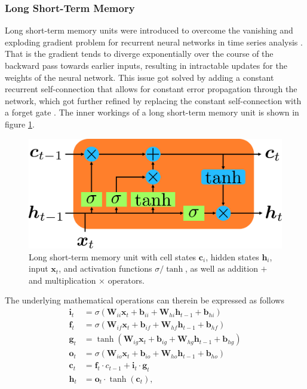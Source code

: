 \subsubsection{Long Short-Term Memory}
Long short-term memory units were introduced to overcome the vanishing and exploding gradient problem for recurrent neural networks in time series analysis \cite{hochreiter1997long}. That is the gradient tends to diverge exponentially over the course of the backward pass towards earlier inputs, resulting in intractable updates for the weights of the neural network. This issue got solved by adding a constant recurrent self-connection that allows for constant error propagation through the network, which got further refined by replacing the constant self-connection with a forget gate \cite{gers1999learning}. The inner workings of a long short-term memory unit is shown in figure \ref{fig::321_lstm}. 
\begin{figure}[h!]
	\centering
	\includegraphics[scale=.28]{chapters/03_background/img/lstm.png}
	\caption{Long short-term memory unit with cell states $\bm{c}_i$, hidden states $\bm{h}_i$, input $\bm{x}_t$, and activation functions $\sigma/\tanh$, as well as addition $+$ and multiplication $\times$ operators.}
	\label{fig::321_lstm}
\end{figure}
The underlying mathematical operations can therein be expressed as follows
\begin{align}
	\bm{i}_t &= \sigma(\bm{W}_{ii}\bm{x}_t+\bm{b}_{ii}+\bm{W}_{hi}\bm{h}_{t-1}+\bm{b}_{hi})\\
	\bm{f}_t &= \sigma(\bm{W}_{if}\bm{x}_t+\bm{b}_{if}+\bm{W}_{hf}\bm{h}_{t-1}+\bm{b}_{hf})\\
	\bm{g}_t &= \tanh(\bm{W}_{ig}\bm{x}_t+\bm{b}_{ig}+\bm{W}_{hg}\bm{h}_{t-1}+\bm{b}_{hg})\\
	\bm{o}_t &= \sigma(\bm{W}_{io}\bm{x}_t+\bm{b}_{io}+\bm{W}_{ho}\bm{h}_{t-1}+\bm{b}_{ho})\\
	\bm{c}_t &= \bm{f}_t\cdot c_{t-1} + \bm{i}_t\cdot\bm{g}_t\\
	\bm{h}_t &= \bm{o}_t \cdot\tanh(\bm{c}_t),
\end{align}
